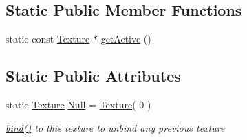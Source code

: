 \subsection*{Static Public Member Functions}
\begin{DoxyCompactItemize}
\item 
static const \hyperlink{class_texture}{Texture} $\ast$ \hyperlink{class_texture_a9213840a2a31164baa96f98b292130b3}{get\+Active} ()
\end{DoxyCompactItemize}
\subsection*{Static Public Attributes}
\begin{DoxyCompactItemize}
\item 
\hypertarget{class_texture_ad3d72b2cbb6e539c5939349ecd259211}{}static \hyperlink{class_texture}{Texture} \hyperlink{class_texture_ad3d72b2cbb6e539c5939349ecd259211}{Null} = \hyperlink{class_texture}{Texture}( 0 )\label{class_texture_ad3d72b2cbb6e539c5939349ecd259211}

\begin{DoxyCompactList}\small\item\em \hyperlink{class_texture_a49f3f1d6ec4370accdd9f007bb8934a5}{bind()} to this texture to unbind any previous texture \end{DoxyCompactList}\end{DoxyCompactItemize}
